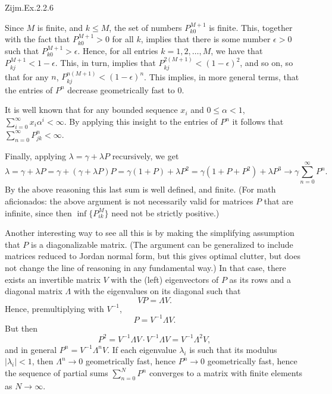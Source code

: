 \begin{exercise}
Zijm.Ex.2.2.6
\begin{solution}
 Since $M$ is finite, and $k\leq M$, the set of numbers $P^{M+1}_{k0}$ is finite.
 This, together with the fact that $P^{M+1}_{k0}>0$ for all $k$, implies that there is some number $\epsilon>0$ such that $P^{M+1}_{k0}>\epsilon$.
 Hence, for all entries $k=1, 2, \ldots, M$, we have that $P^{M+1}_{kj} < 1- \epsilon$.
 This, in turn, implies that $P^{2(M+1)}_{kj} < (1- \epsilon)^2$, and so on, so that for any $n$, $P^{n(M+1)}_{kj} < (1- \epsilon)^n$.
 This implies, in more general terms, that the entries of $P^n$ decrease geometrically fast to $0$.

 It is well known that for any bounded sequence $x_i$ and $0\leq \alpha < 1$, $ \sum_{i=0}^\infty x_i \alpha^i < \infty$.
 By applying this insight to the entries of $P^n$ it follows that $\sum_{n=0}^\infty P^n_{jk} < \infty$.

Finally, applying $\lambda = \gamma + \lambda P$ recursively, we get
\begin{equation*}
 \lambda = \gamma + \lambda P = \gamma + (\gamma + \lambda P)P = \gamma (1+P) + \lambda P^2 = \gamma(1+P+P^2) + \lambda P^3 \to \gamma \sum_{n=0}^\infty P^n.
\end{equation*}
By the above reasoning this last sum is well defined, and finite.
(For math aficionados: the above argument is not necessarily valid for matrices $P$ that are infinite, since then $\inf\{P^{M}_{ik}\}$ need not be strictly positive.)

Another interesting way to see all this is by making the simplifying assumption that $P$ is a diagonalizable matrix.
(The argument can be generalized to include matrices reduced to Jordan normal form, but this gives optimal clutter, but does not change the line of reasoning in any fundamental way.)
In that case, there exists an invertible matrix $V$ with the (left) eigenvectors of $P$ as its rows and a diagonal matrix $\Lambda$ with the eigenvalues on its diagonal such that
\begin{equation*}
 V P = \Lambda V.
\end{equation*}
Hence, premultiplying with $V^{-1}$, 
\begin{equation*}
 P = V^{-1}\Lambda V.
\end{equation*}
But then
\begin{equation*}
P^2 = V^{-1}\Lambda V \cdot V^{-1}\Lambda V= V^{-1}\Lambda^2 V,
\end{equation*}
and in general $P^n = V^{-1}\Lambda^n V$.
If each eigenvalue $\lambda_i$ is such that its modulus $|\lambda_i| < 1$, then $\Lambda^n \to 0$ geometrically fast, hence $P^n\to 0$ geometrically fast, hence the sequence of partial sums $\sum_{n=0}^N P^n$ converges to a matrix with finite elements as $N\to\infty$.


\end{solution}
\end{exercise}
